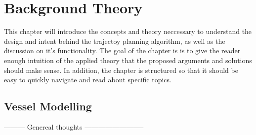 \section{Background Theory}

This chapter will introduce the concepts and theory neccessary to understand the design and intent behind the trajectoy planning algorithm, as well as the discussion on it's functionality.
The goal of the chapter is is to give the reader enough intuition of the applied theory that the proposed arguments and solutions should make sense. In addition, the chapter is structured
so that it should be easy to quickly navigate and read about specific topics.
\subsection{Vessel Modelling}
\iffalse
--------- Genereal thoughts --------------------------

